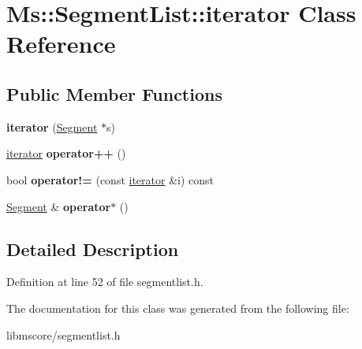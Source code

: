 \hypertarget{class_ms_1_1_segment_list_1_1iterator}{}\section{Ms\+:\+:Segment\+List\+:\+:iterator Class Reference}
\label{class_ms_1_1_segment_list_1_1iterator}
\subsection*{Public Member Functions}
\begin{DoxyCompactItemize}
\item 
\mbox{\label{class_ms_1_1_segment_list_1_1iterator_a40f067740482072df2ec5b332497774c}} 
{\bfseries iterator} (\hyperlink{class_ms_1_1_segment}{Segment} $\ast$s)
\item 
\mbox{\label{class_ms_1_1_segment_list_1_1iterator_a361bf4bde455b874dfc55b08fcec83a6}} 
\hyperlink{class_ms_1_1_segment_list_1_1iterator}{iterator} {\bfseries operator++} ()
\item 
\mbox{\label{class_ms_1_1_segment_list_1_1iterator_a87abc52d2aa7c0d6327202a9a176735c}} 
bool {\bfseries operator!=} (const \hyperlink{class_ms_1_1_segment_list_1_1iterator}{iterator} \&i) const
\item 
\mbox{\label{class_ms_1_1_segment_list_1_1iterator_ad8bde6f7a2338c4ebe9518b7388307c0}} 
\hyperlink{class_ms_1_1_segment}{Segment} \& {\bfseries operator$\ast$} ()
\end{DoxyCompactItemize}


\subsection{Detailed Description}


Definition at line 52 of file segmentlist.\+h.



The documentation for this class was generated from the following file\+:\begin{DoxyCompactItemize}
\item 
libmscore/segmentlist.\+h\end{DoxyCompactItemize}
